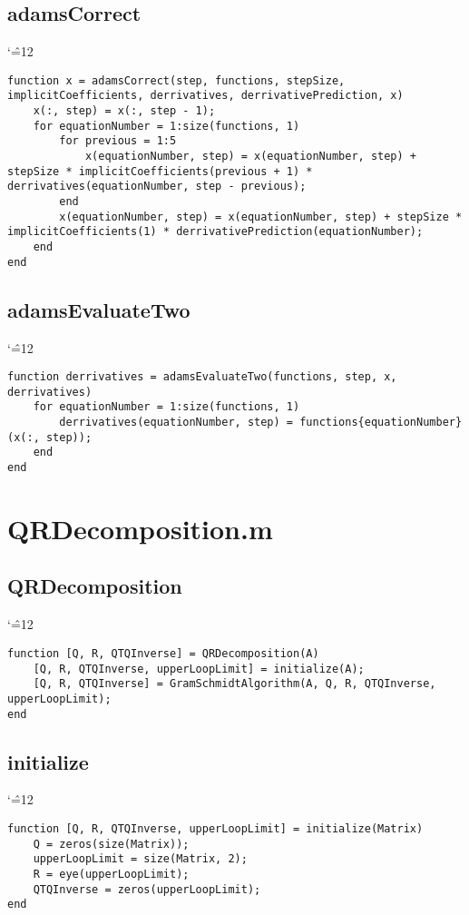 \documentclass[12pt]{report}
\newenvironment{simplechar}{%
   \catcode`\^=12
}{}
\begin{document}
\subsection{adamsCorrect}
\begin{simplechar}
\begin{lstlisting}
function x = adamsCorrect(step, functions, stepSize, implicitCoefficients, derrivatives, derrivativePrediction, x)
    x(:, step) = x(:, step - 1);
    for equationNumber = 1:size(functions, 1)
        for previous = 1:5
            x(equationNumber, step) = x(equationNumber, step) + stepSize * implicitCoefficients(previous + 1) * derrivatives(equationNumber, step - previous);
        end
        x(equationNumber, step) = x(equationNumber, step) + stepSize * implicitCoefficients(1) * derrivativePrediction(equationNumber);
    end
end
\end{lstlisting}
\end{simplechar}

\subsection{adamsEvaluateTwo}
\begin{simplechar}
\begin{lstlisting}
function derrivatives = adamsEvaluateTwo(functions, step, x, derrivatives)
    for equationNumber = 1:size(functions, 1)
        derrivatives(equationNumber, step) = functions{equationNumber}(x(:, step));
    end
end
\end{lstlisting}
\end{simplechar}

\section{QRDecomposition.m}
\subsection{QRDecomposition}
\begin{simplechar}
\begin{lstlisting}
function [Q, R, QTQInverse] = QRDecomposition(A)
    [Q, R, QTQInverse, upperLoopLimit] = initialize(A);
    [Q, R, QTQInverse] = GramSchmidtAlgorithm(A, Q, R, QTQInverse, upperLoopLimit);
end
\end{lstlisting}
\end{simplechar}

\subsection{initialize}
\begin{simplechar}
\begin{lstlisting}
function [Q, R, QTQInverse, upperLoopLimit] = initialize(Matrix)
    Q = zeros(size(Matrix));
    upperLoopLimit = size(Matrix, 2);
    R = eye(upperLoopLimit);
    QTQInverse = zeros(upperLoopLimit);
end
\end{lstlisting}
\end{simplechar}
\end{document}
